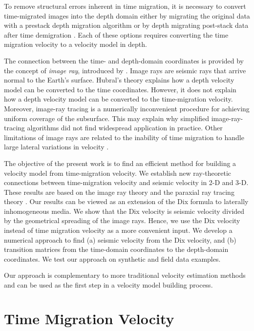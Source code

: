 To remove structural errors inherent in time migration, it is
necessary to convert time-migrated images into the depth domain either
by migrating the original data with a prestack depth migration
algorithm or by depth migrating post-stack data after time demigration
\cite[]{kim}. Each of these options requires converting the time migration
velocity to a velocity model in depth.

The connection between the time- and depth-domain coordinates is
provided by the concept of \emph{image ray}, introduced by
\cite{hubral1977}. Image rays are seismic rays that arrive normal to
the Earth's surface.  Hubral's theory explains how a depth velocity
model can be converted to the time coordinates. However, it does not
explain how a depth velocity model can be converted to the
time-migration velocity.  Moreover, image-ray tracing is a
numerically inconvenient procedure for achieving uniform coverage of
the subsurface. This may explain why simplified image-ray-tracing
algorithms \cite[]{larner,hatton} did not find widespread application
in practice. Other limitations of image rays are related to the
inability of time migration to handle large lateral variations in
velocity \cite[]{plumes,robein}.
 
The objective of the present work is to find an efficient method for
building a velocity model from time-migration velocity.  We
establish new ray-theoretic connections between time-migration
velocity and seismic velocity in 2-D and 3-D.  These results are
based on the image ray theory and the paraxial ray tracing theory
\cite[]{popov-psencik,cerveny,popov}. Our results can be viewed as an
extension of the Dix formula \cite[]{dix1955} to laterally
inhomogeneous media.  We show that the Dix velocity is seismic
velocity divided by the geometrical spreading of the image
rays. Hence, we use the Dix velocity instead of time migration
velocity as a more convenient input.  We develop a numerical
approach to find (a) seismic velocity from the Dix velocity, and
(b) transition matrices from the time-domain coordinates to the
depth-domain coordinates.  We test our approach on synthetic and field
data examples.

Our approach is complementary to more traditional velocity estimation
methods and can be used as the first step in a velocity model building
process.


\section{Time Migration Velocity}


